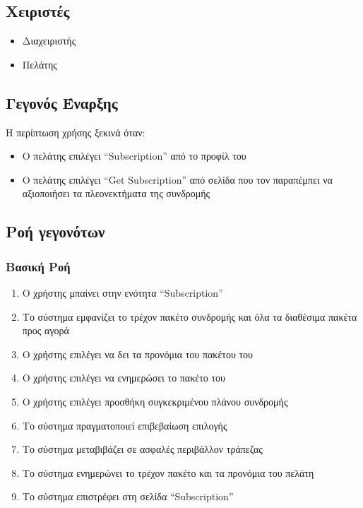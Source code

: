 \documentclass[12pt,a4paper,twoside]{book}
\begin{document}
\subsection{Χειριστές}
\begin{itemize}
  \item Διαχειριστής
  \item Πελάτης
\end{itemize}

\subsection{Γεγονός Έναρξης}
Η περίπτωση χρήσης ξεκινά όταν:
\begin{itemize}
  \item Ο πελάτης επιλέγει “Subscription” από το προφίλ του   %
  \item Ο πελάτης επιλέγει “Get Subscription” από σελίδα που τον παραπέμπει να αξιοποιήσει τα πλεονεκτήματα της συνδρομής %
\end{itemize}

\subsection{Ροή γεγονότων}

\subsubsection{Βασική Ροή}
\begin{enumerate}
  \item Ο χρήστης μπαίνει στην ενότητα “Subscription”  %
  \item Το σύστημα εμφανίζει το τρέχον πακέτο συνδρομής και όλα τα διαθέσιμα πακέτα προς αγορά  %
  \item Ο χρήστης επιλέγει να δει τα προνόμια του πακέτου του   %
  \item O χρήστης επιλέγει να ενημερώσει το πακέτο του %
  \item Ο χρήστης επιλέγει προσθήκη συγκεκριμένου πλάνου συνδρομής   %
  \item Το σύστημα πραγματοποιεί επιβεβαίωση επιλογής   %
  \item Το σύστημα μεταβιβάζει σε ασφαλές περιβάλλον τράπεζας   %
  \item Το σύστημα ενημερώνει το τρέχον πακέτο και τα προνόμια του πελάτη   %
  \item Το σύστημα επιστρέφει στη σελίδα “Subscription”  %
\end{enumerate}
\end{document}
